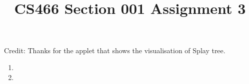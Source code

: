 \documentclass[12pt]{article}
\title{CS466 Section 001 Assignment 3}
\begin{document}
\maketitle

Credit: Thanks for the applet that shows the visualisation of Splay tree.
\begin{enumerate}
\item
\item
\end{enumerate}
\end{document}

